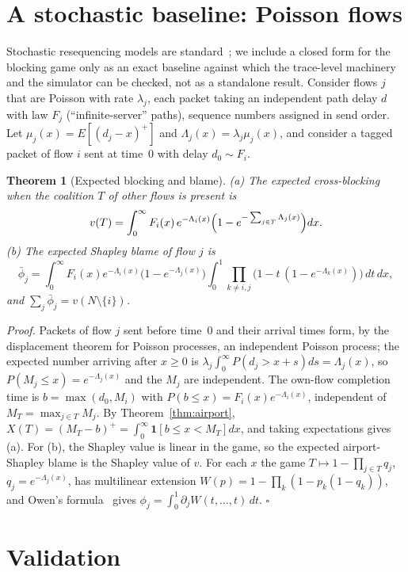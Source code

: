 \documentclass[11pt]{article}
\newtheorem{theorem}{Theorem}
\theoremstyle{definition}
\begin{document}
\section{A stochastic baseline: Poisson flows}\label{sec:poisson}
Stochastic resequencing models are standard~\cite{baccelli1984resequencing,han2005resequencing}; we include a closed form for the blocking game only as an exact baseline against which the trace-level machinery and the simulator can be checked, not as a standalone result. Consider flows $j$ that are Poisson with rate $\lambda_j$, each packet taking an independent path delay $d$ with law $F_j$ (``infinite-server'' paths), sequence numbers assigned in send order. Let $\mu_j(x)=E[(d_j-x)^+]$ and $\Lambda_j(x)=\lambda_j\mu_j(x)$, and consider a tagged packet of flow $i$ sent at time~$0$ with delay $d_0\sim F_i$.
\begin{theorem}[Expected blocking and blame]\label{thm:poisson}
(a) The expected cross-blocking when the coalition $T$ of other flows is present is
\[
v(T)=\int_0^\infty F_i(x)\,e^{-\Lambda_i(x)}\Bigl(1-e^{-\sum_{j\in T}\Lambda_j(x)}\Bigr)dx .
\]
(b) The expected Shapley blame of flow $j$ is
\[
\bar\phi_j=\int_0^\infty F_i(x)e^{-\Lambda_i(x)}\bigl(1-e^{-\Lambda_j(x)}\bigr)\int_0^1\prod_{k\ne i,j}\bigl(1-t\,(1-e^{-\Lambda_k(x)})\bigr)\,dt\,dx,
\]
and $\sum_j\bar\phi_j=v(N\setminus\{i\})$.
\end{theorem}
\emph{Proof.} Packets of flow $j$ sent before time~$0$ and their arrival times form, by the displacement theorem for Poisson processes, an independent Poisson process; the expected number arriving after $x\ge0$ is $\lambda_j\int_0^\infty P(d_j>x+s)ds=\Lambda_j(x)$, so $P(M_j\le x)=e^{-\Lambda_j(x)}$ and the $M_j$ are independent. The own-flow completion time is $b=\max(d_0,M_i)$ with $P(b\le x)=F_i(x)e^{-\Lambda_i(x)}$, independent of $M_T=\max_{j\in T}M_j$. By Theorem~\ref{thm:airport}, $X(T)=(M_T-b)^+=\int_0^\infty\mathbf 1[b\le x<M_T]dx$, and taking expectations gives (a). For (b), the Shapley value is linear in the game, so the expected airport-Shapley blame is the Shapley value of $v$. For each $x$ the game $T\mapsto1-\prod_{j\in T}q_j$, $q_j=e^{-\Lambda_j(x)}$, has multilinear extension $W(p)=1-\prod_k(1-p_k(1-q_k))$, and Owen's formula~\cite{owen1972multilinear} gives $\phi_j=\int_0^1\partial_jW(t,\dots,t)\,dt$. \hfill$\square$

\section{Validation}\label{sec:val}
\end{document}
